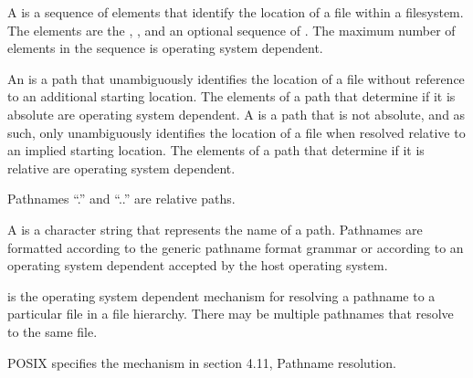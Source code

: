 \pnum
A  is
a sequence of elements that identify
the location of a file within a filesystem.
The elements are the
,
,
and an optional sequence of .
The maximum number of elements in the sequence is
operating system dependent.

\pnum
An  is a path that unambiguously
identifies the location of a file without reference to an additional starting
location. The elements of a path that determine if it is absolute are
operating system dependent.
A  is
a path that is not absolute, and as such, only unambiguously
identifies the location of a file when resolved relative to
an implied starting location. The elements of a path that determine if it is
relative are operating system dependent.
\begin{note}
Pathnames ``.'' and ``..'' are relative paths.
\end{note}

\pnum
A  is
a character string that represents the name of a path. Pathnames are
formatted according to the generic pathname format grammar
or according to an
operating system dependent
 accepted by the host operating system.

\pnum
{}
is the operating system dependent mechanism for resolving
a pathname to a particular file in a file hierarchy. There may be multiple
pathnames that resolve to the same file.
\begin{example} POSIX specifies the mechanism in section 4.11, Pathname resolution.
\end{example}

